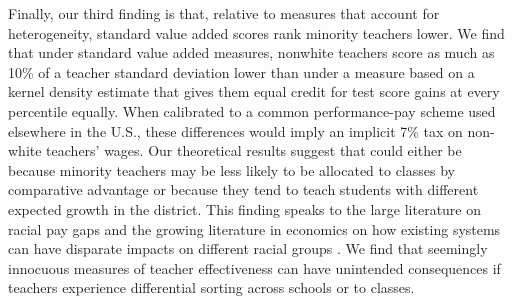 \documentclass{article}
\theoremstyle{definition}
\theoremstyle{definition}
\theoremstyle{definition}
\theoremstyle{definition}
\begin{document}
Finally, our third finding is that, relative to measures that account for heterogeneity, standard value added scores rank minority teachers lower. We find that under standard value added measures, nonwhite teachers score as much as 10\% of a teacher standard deviation lower than under a measure based on a kernel density estimate that gives them equal credit for test score gains at every percentile equally. When calibrated to a common performance-pay scheme used elsewhere in the U.S., these differences would imply an implicit 7\% tax on non-white teachers' wages. Our theoretical results suggest that could either be because minority teachers may be less likely to be allocated to classes by comparative advantage or because they tend to teach students with different expected growth in the district. This finding  speaks to the large literature on racial pay gaps and the growing literature in economics on how existing systems can have disparate impacts on different racial groups \citep{bohren2022systemic}. We find that seemingly innocuous measures of teacher effectiveness can have unintended consequences if teachers experience differential sorting across schools or to classes.





\end{document}

